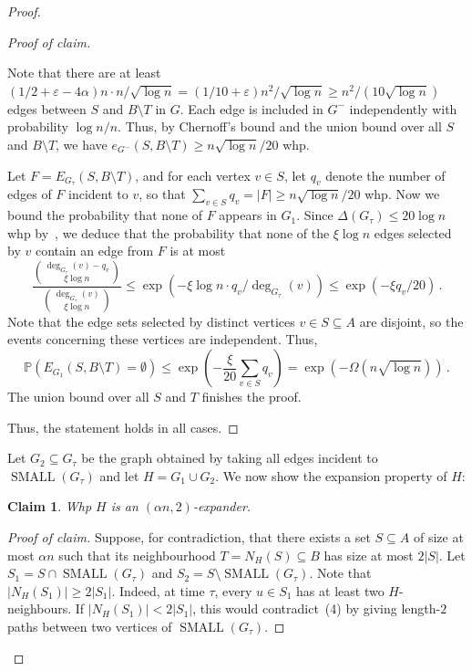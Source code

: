\documentclass[reqno,final,a4paper]{amsart}
\numberwithin{equation}{section}
\newtheorem{claim}[theorem]{Claim}
\theoremstyle{definition}
\theoremstyle{remark}
\renewcommand{\Pr}{\mathbb{P}}
\newcommand{\eps}{\varepsilon}
\newcommand{\SMA}{\operatorname{SMALL}}
\newenvironment{proofclaim}[1][Proof of claim]{\begin{proof}[#1]\renewcommand*{\qedsymbol}{\(\blacksquare\)}}{\end{proof}}
\begin{document}
\begin{proof}
\begin{proofclaim}
\begin{itemize}
           Note that there are at least $(1/2 + \eps - 4\alpha)n\cdot n/\sqrt{\log n} = (1/10+\eps)n^2/\sqrt{\log n}\geq n^2/(10\sqrt{\log n})$ edges between $S$ and $B\setminus T$ in $G$.
            Each edge is included in $G^-$ independently with probability $\log n/n$. Thus, by Chernoff's bound and the union bound over all $S$ and $B\setminus T$, we have $e_{G^-}(S,B\setminus T)\geq n\sqrt{\log n}/20$ whp. 
            
            Let $F = E_{G_\tau}(S,B\setminus T)$, and for each vertex $v\in S$, let $q_v$ denote the number of edges of $F$ incident to $v$, so that $\sum_{v\in S}q_v = |F|\geq n\sqrt{\log n}/20$ whp.
            Now we bound the probability that none of $F$ appears in $G_1$. 
            Since $\Delta(G_\tau)\leq 20\log n$ whp by~, 
            we deduce that the probability that none of the $\xi\log n$ edges selected by $v$ contain an edge from $F$ is at most 
            \[
                \frac{\binom{\deg_{G_\tau}(v)-q_v}{\xi\log n}}{\binom{\deg_{G_\tau}(v)}{\xi\log n}}\leq \exp(-\xi\log n\cdot q_v/\deg_{G_\tau}(v))\leq \exp(-\xi q_v/20)\,.
            \]
            Note that the edge sets selected by distinct vertices $v\in S\subseteq A$ are disjoint, so the events concerning these vertices are independent. Thus, 
            \[
                \Pr(E_{G_1}(S,B\setminus T) = \emptyset)\leq \exp\left(-\frac{\xi}{20}\sum_{v\in S}q_v\right) = \exp(-\Omega(n\sqrt{\log n}))\,.
            \]
            The union bound over all $S$ and $T$ finishes the proof. 
        \end{itemize}
        Thus, the statement holds in all cases.
    \end{proofclaim}
    Let $G_2\subseteq G_\tau$ be the graph obtained by taking all edges incident to $\SMA(G_\tau)$ and let $H = G_1\cup G_2$. 
    We now show the expansion property of $H$:
    \begin{claim}\label{cla:G-expander}
        Whp $H$ is an $(\alpha n,2)$-expander.
    \end{claim}
    \begin{proofclaim}
        Suppose, for contradiction, that there exists a set $S\subseteq A$ of size at most $\alpha n$ such that its neighbourhood $T = N_{H}(S)\subseteq B$ has size at most $2|S|$. 
        Let $S_1 = S \cap \SMA(G_\tau)$ and $S_2 = S\setminus \SMA(G_\tau)$. 
        Note that $|N_{H}(S_1)| \geq 2|S_1|$. 
        Indeed, at time $\tau$, every $u\in S_1$ has at least two $H$-neighbours. If $|N_H(S_1)|<2|S_1|$, this would contradict~(4) by giving length-$2$ paths between two vertices of $\SMA(G_\tau)$.

\end{proofclaim}
\end{proof}
\end{document}
